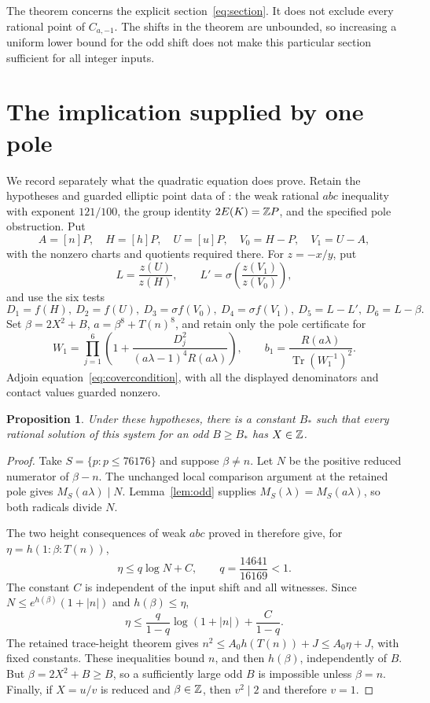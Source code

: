 \documentclass[11pt,a4paper]{article}
\newtheorem{proposition}[theorem]{Proposition}
\DeclareMathOperator{\Tr}{Tr}
\begin{document}
The theorem concerns the explicit section~\eqref{eq:section}.
It does not exclude every rational point of $C_{a,-1}$.
The shifts in the theorem are unbounded, so increasing a
uniform lower bound for the odd shift does not make this
particular section sufficient for all integer inputs.

\section{The implication supplied by one pole}

We record separately what the quadratic equation does prove.
Retain the hypotheses and guarded elliptic point data of
\cite{Conditional}: the weak rational $abc$ inequality with
exponent $121/100$, the group identity $2E(K)=\mathbb Z P$, and the
specified pole obstruction. Put
\[
 A=[n]P,\quad H=[h]P,\quad U=[u]P,\quad
 V_0=H-P,\quad V_1=U-A,
\]
with the nonzero charts and quotients required there. For
$z=-x/y$, put
\[
 L=\frac{z(U)}{z(H)},\qquad
 L'=\sigma\!\left(\frac{z(V_1)}{z(V_0)}\right),
\]
and use the six tests
\[
 D_1=f(H),\ D_2=f(U),\ D_3=\sigma f(V_0),\
 D_4=\sigma f(V_1),\ D_5=L-L',\ D_6=L-\beta.
\]
Set $\beta=2X^2+B$, $a=\beta^8+T(n)^8$, and retain
only the pole certificate for
\[
 W_1=\prod_{j=1}^6\left(1+
        \frac{D_j^2}{(a\lambda-1)^4R(a\lambda)}\right),
 \qquad b_1=\frac{R(a\lambda)}{\Tr(W_1^{-1})^2}.
\]
Adjoin equation~\eqref{eq:covercondition}, with all the displayed
denominators and contact values guarded nonzero.

\begin{proposition}\label{prop:soundness}
Under these hypotheses, there is a constant $B_*$ such that
every rational solution of this system for an odd $B\ge B_*$
has $X\in\mathbb Z$.
\end{proposition}
\begin{proof}
Take $S=\{p:p\le76176\}$ and suppose $\beta\ne n$.
Let $N$ be the positive reduced numerator of $\beta-n$.
The unchanged local comparison argument at the retained pole
gives $M_S(a\lambda)\mid N$.
Lemma~\ref{lem:odd} supplies $M_S(\lambda)=M_S(a\lambda)$,
so both radicals divide $N$.

The two height consequences of weak $abc$ proved in
\cite[Lemmas~2.1 and~2.2]{Conditional} therefore give, for
$\eta=h(1:\beta:T(n))$,
\[
                  \eta\le q\log N+C,
                  \qquad q=\frac{14641}{16169}<1.
\]
The constant $C$ is independent of the input shift and all
witnesses. Since
$N\le e^{h(\beta)}(1+|n|)$ and $h(\beta)\le\eta$,
\[
          \eta\le\frac{q}{1-q}\log(1+|n|)+\frac{C}{1-q}.
\]
The retained trace-height theorem gives
$n^2\le A_0h(T(n))+J\le A_0\eta+J$, with fixed constants.
These inequalities bound $n$, and then $h(\beta)$, independently
of $B$. But $\beta=2X^2+B\ge B$, so a sufficiently large odd
$B$ is impossible unless $\beta=n$. Finally, if $X=u/v$ is
reduced and $\beta\in\mathbb Z$, then $v^2\mid2$ and therefore $v=1$.
\end{proof}
\end{document}
